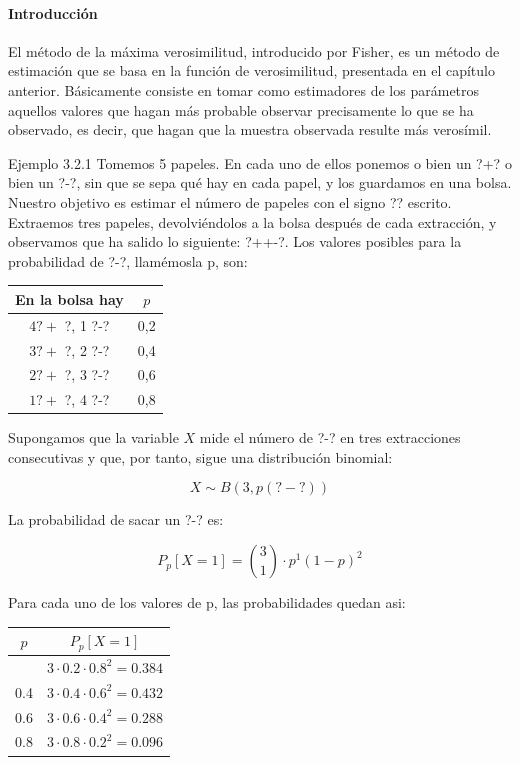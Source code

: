 \documentclass[
]{article}
\begin{document}
\paragraph{Introducción}\label{introducciuxf3n-1}

El método de la máxima verosimilitud, introducido por Fisher, es un método de estimación que se basa en la función de verosimilitud, presentada en el capítulo anterior. Básicamente consiste en tomar como estimadores de los parámetros aquellos valores que hagan más probable observar precisamente lo que se ha observado, es decir, que hagan que la muestra observada resulte más verosímil.

Ejemplo 3.2.1 Tomemos 5 papeles. En cada uno de ellos ponemos o bien un ?+? o bien un ?-?, sin que se sepa qué hay en cada papel, y los guardamos en una bolsa. Nuestro objetivo es estimar el número de papeles con el signo ?? escrito. Extraemos tres papeles, devolviéndolos a la bolsa después de cada extracción, y observamos que ha salido lo siguiente: ?++-?. Los valores posibles para la probabilidad de ?-?, llamémosla p, son:

\begin{longtable}[]{@{}cc@{}}
\toprule\noalign{}
En la bolsa hay & \(p\) \\
\midrule\noalign{}
\endhead
\bottomrule\noalign{}
\endlastfoot
\(4 ?+\) ?, 1 ?-? & 0,2 \\
\(3 ?+\) ?, 2 ?-? & 0,4 \\
\(2 ?+\) ?, 3 ?-? & 0,6 \\
\(1 ?+\) ?, 4 ?-? & 0,8 \\
\end{longtable}

Supongamos que la variable \(X\) mide el número de ?-? en tres extracciones consecutivas y que, por tanto, sigue una distribución binomial:

\[
X \sim B(3, p(?-?))
\]

La probabilidad de sacar un ?-? es:

\[
P_{p}[X=1]=\binom{3}{1} \cdot p^{1}(1-p)^{2}
\]

Para cada uno de los valores de p, las probabilidades quedan asi:

\begin{longtable}[]{@{}cc@{}}
\toprule\noalign{}
\(p\) & \(P_{p}[X=1]\) \\
\midrule\noalign{}
\endhead
\bottomrule\noalign{}
\endlastfoot
0.2 & \(3 \cdot 0.2 \cdot 0.8^{2}=0.384\) \\
0.4 & \(3 \cdot 0.4 \cdot 0.6^{2}=0.432\) \\
0.6 & \(3 \cdot 0.6 \cdot 0.4^{2}=0.288\) \\
0.8 & \(3 \cdot 0.8 \cdot 0.2^{2}=0.096\) \\
\end{longtable}
\end{document}
